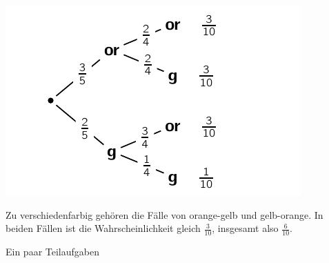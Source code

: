 \documentclass[a4paper,11pt]{../exam2e}
\begin{document}
\begin{questions}
\begin{solution}
\begin{subparts}
	\includegraphics{baumdiagramm}

	\subpart Zu verschiedenfarbig gehören die Fälle von orange-gelb und gelb-orange. In beiden Fällen ist die Wahrscheinlichkeit gleich $\frac{3}{10}$, insgesamt also $\frac{6}{10}$.
\end{subparts}

\end{solution}









\question Ein paar Teilaufgaben



\end{questions}%


\clearpage
\addtocounter{page}{-1}
\thispagestyle{empty} 



\end{document}
